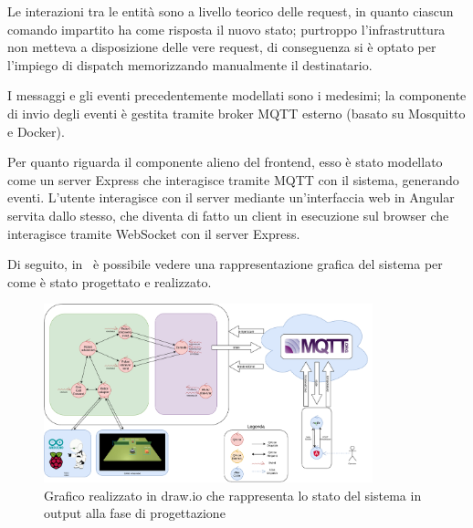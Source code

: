 \documentclass{llncs}
\begin{document}
Le interazioni tra le entità sono a livello teorico delle request, in quanto ciascun comando impartito ha come risposta il nuovo stato;
purtroppo l'infrastruttura non metteva a disposizione delle vere request, di conseguenza si è optato per l'impiego di dispatch memorizzando manualmente il destinatario.

I messaggi e gli eventi precedentemente modellati sono i medesimi;
la componente di invio degli eventi è gestita tramite broker MQTT esterno (basato su Mosquitto e Docker).

Per quanto riguarda il componente alieno del frontend, esso è stato modellato come un server Express che interagisce tramite MQTT con il sistema, generando eventi.
L'utente interagisce con il server mediante un'interfaccia web in Angular servita dallo stesso, che diventa di fatto un client in esecuzione sul browser che interagisce tramite WebSocket con il server Express.

Di seguito, in~ è possibile vedere una rappresentazione grafica del sistema per come è stato progettato e realizzato.

\begin{figure}[h]
  \centering%
  \includegraphics[width=0.85\textwidth]{res/project}%
  \caption{Grafico realizzato in draw.io che rappresenta lo stato del sistema in output alla fase di progettazione}%
  \label{fig:project}
\end{figure}
\end{document}
